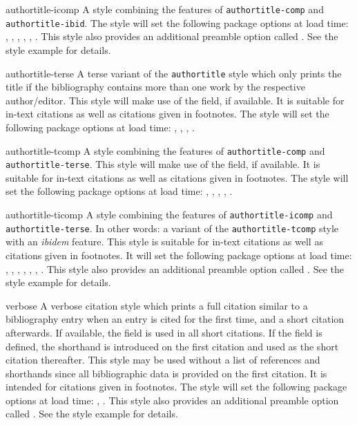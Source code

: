 \begin{marglist}
\item[authortitle-icomp]
A style combining the features of \texttt{authortitle-comp} and \texttt{authortitle-ibid}. The style will set the following package options at load time: , , , , , . This style also provides an additional preamble option called . See the style example for details.

\item[authortitle-terse]
A terse variant of the \texttt{authortitle} style which only prints the title if the bibliography contains more than one work by the respective author\slash editor. This style will make use of the  field, if available. It is suitable for in-text citations as well as citations given in footnotes. The style will set the following package options at load time: , , , .

\item[authortitle-tcomp]
A style combining the features of \texttt{authortitle-comp} and \texttt{authortitle-terse}. This style will make use of the  field, if available. It is suitable for in-text citations as well as citations given in footnotes. The style will set the following package options at load time: , , , , .

\item[authortitle-ticomp]
A style combining the features of \texttt{authortitle-icomp} and \texttt{authortitle-terse}. In other words: a variant of the \texttt{authortitle-tcomp} style with an \emph{ibidem} feature. This style is suitable for in-text citations as well as citations given in footnotes. It will set the following package options at load time: , , , , , , . This style also provides an additional preamble option called . See the style example for details.

\item[verbose]
A verbose citation style which prints a full citation similar to a bibliography entry when an entry is cited for the first time, and a short citation afterwards. If available, the  field is used in all short citations. If the  field is defined, the shorthand is introduced on the first citation and used as the short citation thereafter. This style may be used without a list of references and shorthands since all bibliographic data is provided on the first citation. It is intended for citations given in footnotes. The style will set the following package options at load time: , . This style also provides an additional preamble option called . See the style example for details.


\end{marglist}
